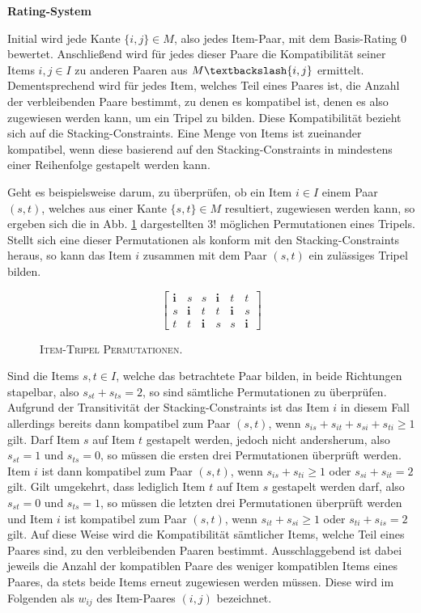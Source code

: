 \vfill
\pagebreak

\textbf{Rating-System}

Initial wird jede Kante $\{i, j\} \in M$, also jedes Item-Paar, mit dem Basis-Rating $0$ bewertet.
Anschließend wird für jedes dieser Paare die Kompatibilität seiner Items $i, j \in I$ zu anderen Paaren aus $M \textbackslash \{i, j\}$ ermittelt.
Dementsprechend wird für jedes Item, welches Teil eines Paares ist, die Anzahl der verbleibenden Paare bestimmt, zu denen es kompatibel ist, denen es also zugewiesen werden kann, um ein Tripel zu bilden. Diese Kompatibilität bezieht sich auf die Stacking-Constraints.
Eine Menge von Items ist zueinander kompatibel, wenn diese basierend auf den Stacking-Constraints in mindestens einer
Reihenfolge gestapelt werden kann.

Geht es beispielsweise darum, zu überprüfen, ob ein Item $i \in I$ einem Paar $(s, t)$, welches aus einer Kante $\{s, t\} \in M$ resultiert,
zugewiesen werden kann, so ergeben sich die in Abb. \ref{fig:triple_permutations} dargestellten $3!$ möglichen Permutationen eines Tripels. Stellt sich eine dieser Permutationen als konform mit den Stacking-Constraints heraus, so kann das Item $i$ zusammen mit dem Paar $(s, t)$ ein zulässiges Tripel bilden.
\begin{figure}[H]
\[
\begin{bmatrix}
  \boldsymbol{i} & s & s & \boldsymbol{i} & t & t \\
  s & \boldsymbol{i} & t & t & \boldsymbol{i} & s \\
  t & t & \boldsymbol{i} & s & s & \boldsymbol{i}
\end{bmatrix}
\]
\caption{\textsc{Item-Tripel Permutationen.}}
\label{fig:triple_permutations}
\end{figure}
Sind die Items $s, t \in I$, welche das betrachtete Paar bilden, in beide Richtungen stapelbar, also
$s_{st} + s_{ts} = 2$, so sind sämtliche Permutationen zu überprüfen.
Aufgrund der Transitivität der Stacking-Constraints ist das Item $i$ in diesem Fall allerdings bereits dann kompatibel zum Paar $(s, t)$,
wenn $s_{is} + s_{it} + s_{si} + s_{ti} \geq 1$ gilt.
Darf Item $s$ auf Item $t$ gestapelt werden, jedoch nicht andersherum, also $s_{st} = 1$ und $s_{ts} = 0$,
so müssen die ersten drei Permutationen überprüft werden. Item $i$ ist dann kompatibel zum Paar $(s, t)$,
wenn $s_{is} + s_{ti} \geq 1$ oder $s_{si} + s_{it} = 2$ gilt.
Gilt umgekehrt, dass lediglich Item $t$ auf Item $s$ gestapelt werden darf, also $s_{st} = 0$ und $s_{ts} = 1$, so
müssen die letzten drei Permutationen überprüft werden und Item $i$ ist kompatibel zum Paar $(s, t)$,
wenn $s_{it} + s_{si} \geq 1$ oder $s_{ti} + s_{is} = 2$ gilt.\newline
Auf diese Weise wird die Kompatibilität sämtlicher Items, welche Teil eines Paares sind, zu den verbleibenden Paaren bestimmt.
Ausschlaggebend ist dabei jeweils die Anzahl der kompatiblen Paare des weniger kompatiblen Items eines Paares,
da stets beide Items erneut zugewiesen werden müssen. Diese wird im Folgenden als 
$w_{ij}$ des Item-Paares $(i, j)$ bezeichnet.


